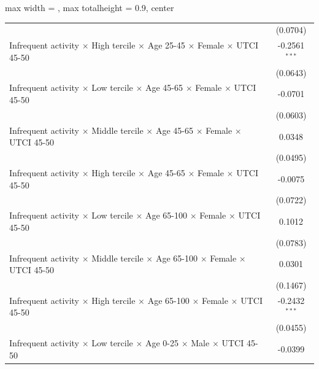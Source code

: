 \begin{table}[htbp]
\begin{adjustbox}{max width = \textwidth, max totalheight = 0.9\textheight, center}
\begin{tabular}{lc}
                                                                                                                 & (0.0704)\\   
         Infrequent activity $\times$ High tercile $\times$ Age 25-45 $\times$ Female $\times$ UTCI 45-50        & -0.2561$^{***}$\\   
                                                                                                                 & (0.0643)\\   
         Infrequent activity $\times$ Low tercile $\times$ Age 45-65 $\times$ Female $\times$ UTCI 45-50         & -0.0701\\   
                                                                                                                 & (0.0603)\\   
         Infrequent activity $\times$ Middle tercile $\times$ Age 45-65 $\times$ Female $\times$ UTCI 45-50      & 0.0348\\   
                                                                                                                 & (0.0495)\\   
         Infrequent activity $\times$ High tercile $\times$ Age 45-65 $\times$ Female $\times$ UTCI 45-50        & -0.0075\\   
                                                                                                                 & (0.0722)\\   
         Infrequent activity $\times$ Low tercile $\times$ Age 65-100 $\times$ Female $\times$ UTCI 45-50        & 0.1012\\   
                                                                                                                 & (0.0783)\\   
         Infrequent activity $\times$ Middle tercile $\times$ Age 65-100 $\times$ Female $\times$ UTCI 45-50     & 0.0301\\   
                                                                                                                 & (0.1467)\\   
         Infrequent activity $\times$ High tercile $\times$ Age 65-100 $\times$ Female $\times$ UTCI 45-50       & -0.2432$^{***}$\\   
                                                                                                                 & (0.0455)\\   
         Infrequent activity $\times$ Low tercile $\times$ Age 0-25 $\times$ Male $\times$ UTCI 45-50            & -0.0399\\   

\end{tabular}
\end{adjustbox}
\end{table}
